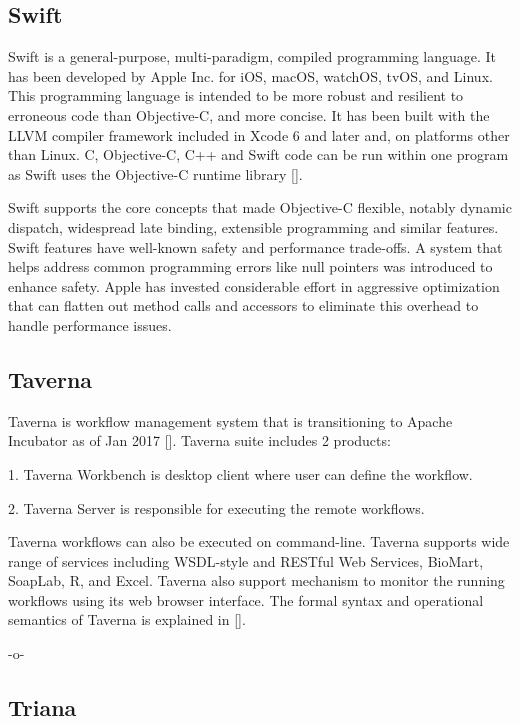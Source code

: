 \subsection{Swift}

Swift is a general-purpose, multi-paradigm, compiled programming
language. It has been developed by Apple Inc. for iOS, macOS, watchOS,
tvOS, and Linux. This programming language is intended to be more
robust and resilient to erroneous code than Objective-C, and more
concise. It has been built with the LLVM compiler framework included
in Xcode 6 and later and, on platforms other than Linux. C,
Objective-C, C++ and Swift code can be run within one program as Swift
uses the Objective-C runtime library [\cite{www-swift-wikipedia}].

Swift supports the core concepts that made Objective-C flexible,
notably dynamic dispatch, widespread late binding, extensible
programming and similar features. Swift features have well-known
safety and performance trade-offs. A system that helps address common
programming errors like null pointers was introduced to enhance
safety. Apple has invested considerable effort in aggressive
optimization that can flatten out method calls and accessors to
eliminate this overhead to handle performance issues.
      
\subsection{Taverna}

Taverna is workflow management system that is transitioning to Apache
Incubator as of Jan 2017 [\cite{www-taverna}]. Taverna suite includes 2
products:

1. Taverna Workbench is desktop client where user can define the
workflow.

2. Taverna Server is responsible for executing the remote workflows.


Taverna workflows can also be executed on command-line.  Taverna
supports wide range of services including WSDL-style and RESTful
Web Services, BioMart, SoapLab, R, and Excel. Taverna also
support mechanism to monitor the running workflows using its web
browser interface. The formal syntax and operational semantics
of Taverna is explained in [\cite{taverna-paper}].

-o-

\subsection{Triana}

